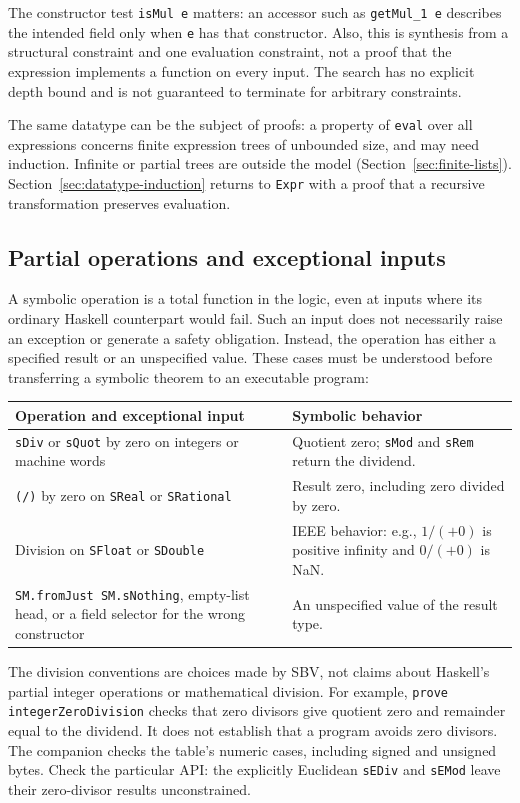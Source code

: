 \documentclass[review]{jfp-epi}
\newcommand{\code}[1]{\texttt{#1}}
\begin{document}
The constructor test \code{isMul e} matters: an accessor such as
\code{getMul\_1 e} describes the intended field only when \code{e} has that
constructor. Also, this is synthesis from a structural constraint and one
evaluation constraint, not a proof that the expression implements a function
on every input. The search has no explicit depth bound and is not guaranteed
to terminate for arbitrary constraints.

The same datatype can be the subject of proofs: a property of \code{eval} over
all expressions concerns finite expression trees of unbounded size, and may
need induction. Infinite or partial trees are outside the model
(Section~\ref{sec:finite-lists}). Section~\ref{sec:datatype-induction} returns to
\code{Expr} with a proof that a recursive transformation preserves evaluation.




\subsection{Partial operations and exceptional inputs}
\label{sec:partial-operations}

A symbolic operation is a total function in the logic, even at inputs where
its ordinary Haskell counterpart would fail. Such an input does not necessarily
raise an exception or generate a safety obligation. Instead, the operation has
either a specified result or an unspecified value. These cases must be
understood before transferring a symbolic theorem to an executable program:
\begin{center}
\begin{tabularx}{\linewidth}{@{}XX@{}}
\toprule
Operation and exceptional input & Symbolic behavior \\
\midrule
\code{sDiv} or \code{sQuot} by zero on integers or machine words
  & Quotient zero; \code{sMod} and \code{sRem} return the dividend. \\
\code{(/)} by zero on \code{SReal} or \code{SRational}
  & Result zero, including zero divided by zero. \\
Division on \code{SFloat} or \code{SDouble}
  & IEEE behavior: e.g., $1/(+0)$ is positive infinity and $0/(+0)$ is NaN. \\
\code{SM.fromJust SM.sNothing}, empty-list head, or a field selector for the wrong constructor
  & An unspecified value of the result type. \\
\bottomrule
\end{tabularx}
\end{center}
The division conventions are choices made by SBV, not claims about Haskell's
partial integer operations or mathematical division. For example,
\code{prove integerZeroDivision} checks that zero divisors give quotient zero
and remainder equal to the dividend. It does not establish that a program
avoids zero divisors. The companion checks the table's numeric cases, including
signed and unsigned bytes. Check the particular API: the explicitly Euclidean
\code{sEDiv} and \code{sEMod} leave their zero-divisor results unconstrained.
\end{document}

